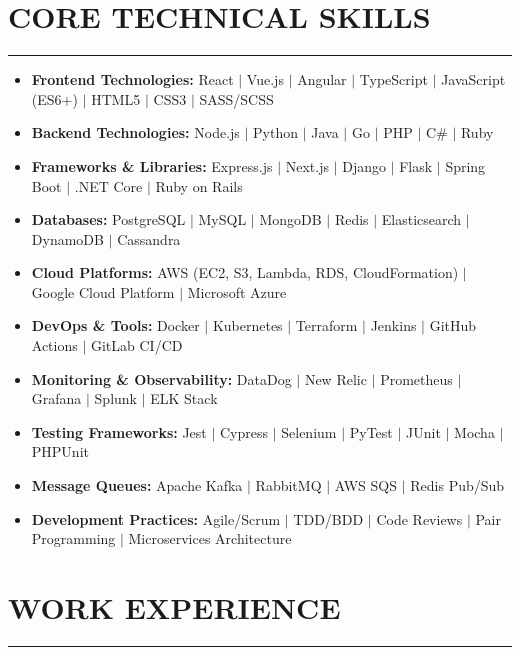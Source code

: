 \documentclass[a4paper,10pt]{article}           %
\begin{document}
    \section*{CORE TECHNICAL SKILLS}
    \vspace{-0.5em}
    \hrule
    \vspace{0.3cm}
    \begin{itemize}[leftmargin=0.2cm, itemsep=0pt, label=--]
        \item \textbf{Frontend Technologies:} React $|$ Vue.js $|$ Angular $|$ TypeScript $|$ JavaScript (ES6+) $|$ HTML5 $|$ CSS3 $|$ SASS/SCSS
        \item \textbf{Backend Technologies:} Node.js $|$ Python $|$ Java $|$ Go $|$ PHP $|$ C\# $|$ Ruby
        \item \textbf{Frameworks \& Libraries:} Express.js $|$ Next.js $|$ Django $|$ Flask $|$ Spring Boot $|$ .NET Core $|$ Ruby on Rails
        \item \textbf{Databases:} PostgreSQL $|$ MySQL $|$ MongoDB $|$ Redis $|$ Elasticsearch $|$ DynamoDB $|$ Cassandra
        \item \textbf{Cloud Platforms:} AWS (EC2, S3, Lambda, RDS, CloudFormation) $|$ Google Cloud Platform $|$ Microsoft Azure
        \item \textbf{DevOps \& Tools:} Docker $|$ Kubernetes $|$ Terraform $|$ Jenkins $|$ GitHub Actions $|$ GitLab CI/CD
        \item \textbf{Monitoring \& Observability:} DataDog $|$ New Relic $|$ Prometheus $|$ Grafana $|$ Splunk $|$ ELK Stack
        \item \textbf{Testing Frameworks:} Jest $|$ Cypress $|$ Selenium $|$ PyTest $|$ JUnit $|$ Mocha $|$ PHPUnit
        \item \textbf{Message Queues:} Apache Kafka $|$ RabbitMQ $|$ AWS SQS $|$ Redis Pub/Sub
        \item \textbf{Development Practices:} Agile/Scrum $|$ TDD/BDD $|$ Code Reviews $|$ Pair Programming $|$ Microservices Architecture
    \end{itemize}

    \section*{WORK EXPERIENCE}
    \vspace{-0.5em}
    \hrule
    \vspace{0.3cm}
\end{document}

